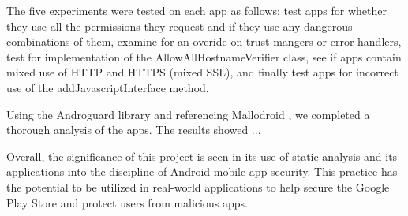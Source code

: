 The five experiments were tested on each app as follows: test apps for whether they use all the permissions they request and if they use any dangerous combinations of them, examine for an overide on trust mangers or error handlers, 
test for implementation of the AllowAllHostnameVerifier class, see if apps contain mixed use of HTTP and HTTPS (mixed SSL), and finally test apps for incorrect use of the addJavascriptInterface method.

Using the Androguard library \cite{androguard} and referencing Mallodroid \cite{10.1145/2382196.2382205}, we completed a thorough analysis of the apps. The results showed ... %

Overall, the significance of this project is seen in its use of static analysis and its applications into the discipline of Android mobile app security. This practice has the potential to be utilized in real-world applications to help secure the Google Play Store and protect users from malicious apps. 
